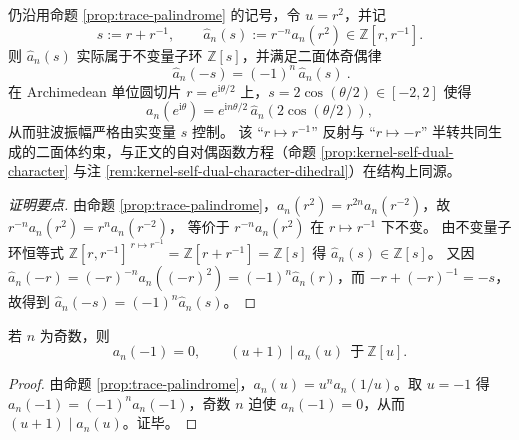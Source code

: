 \begin{conclusion}\label{con:sync-kernel-weighted-archimedean-teichmueller-dihedral}
仍沿用命题 \ref{prop:trace-palindrome} 的记号，令 \(u=r^2\)，并记
\[
s:=r+r^{-1},\qquad \widehat a_n(s):=r^{-n}a_n(r^2)\in\mathbb{Z}[r,r^{-1}].
\]
则 \(\widehat a_n(s)\) 实际属于不变量子环 \(\mathbb{Z}[s]\)，并满足二面体奇偶律
\[
\boxed{\ \widehat a_n(-s)=(-1)^n\,\widehat a_n(s)\ }.
\]
在 Archimedean 单位圆切片 \(r=e^{\mathrm{i}\theta/2}\) 上，\(s=2\cos(\theta/2)\in[-2,2]\) 使得
\[
a_n(e^{\mathrm{i}\theta})=e^{\mathrm{i}n\theta/2}\,\widehat a_n(2\cos(\theta/2)),
\]
从而驻波振幅严格由实变量 \(s\) 控制。
该 “\(r\mapsto r^{-1}\)” 反射与 “\(r\mapsto -r\)” 半转共同生成的二面体约束，与正文的自对偶函数方程（命题 \ref{prop:kernel-self-dual-character} 与注 \ref{rem:kernel-self-dual-character-dihedral}）在结构上同源。
\end{conclusion}
\begin{proof}[证明要点]
由命题 \ref{prop:trace-palindrome}，\(a_n(r^2)=r^{2n}a_n(r^{-2})\)，故
\(
r^{-n}a_n(r^2)=r^{n}a_n(r^{-2})
\)，
等价于 \(r^{-n}a_n(r^2)\) 在 \(r\mapsto r^{-1}\) 下不变。
由不变量子环恒等式 \(\mathbb{Z}[r,r^{-1}]^{\,r\mapsto r^{-1}}=\mathbb{Z}[r+r^{-1}]=\mathbb{Z}[s]\) 得 \(\widehat a_n(s)\in\mathbb{Z}[s]\)。
又因 \(\widehat a_n(-r)=(-r)^{-n}a_n((-r)^2)=(-1)^n\widehat a_n(r)\)，而 \(-r+(-r)^{-1}=-s\)，故得到 \(\widehat a_n(-s)=(-1)^n\widehat a_n(s)\)。
\end{proof}

\begin{corollary}[奇阶消失律]\label{cor:trace-odd-vanish}
若 $n$ 为奇数，则
\[
a_n(-1)=0,
\qquad
(u+1)\mid a_n(u)\ \ \text{于}\ \mathbb{Z}[u].
\]
\end{corollary}
\begin{proof}
由命题 \ref{prop:trace-palindrome}，$a_n(u)=u^n a_n(1/u)$。取 $u=-1$ 得 $a_n(-1)=(-1)^n a_n(-1)$，奇数 $n$ 迫使 $a_n(-1)=0$，从而 $(u+1)\mid a_n(u)$。证毕。
\end{proof}

